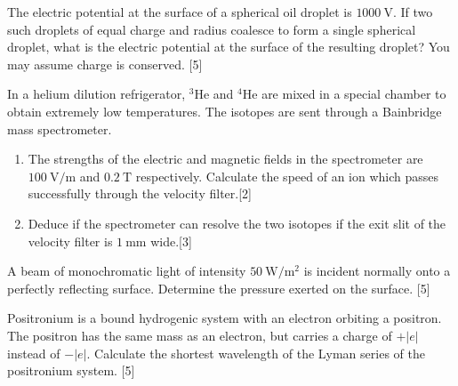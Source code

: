 \begin{problem}
    \begin{subproblem}
        The electric potential at the surface of a spherical oil droplet is $\qty{1000}{\V}$. If two such droplets of equal charge and radius coalesce to form a single spherical droplet, what is the electric potential at the surface of the resulting droplet? You may assume charge is conserved.
    \hfill{[5]}\end{subproblem}
    \begin{subproblem}
        In a helium dilution refrigerator, ${}^{3}\mathrm{He}$ and ${}^{4}\mathrm{He}$ are mixed in a special chamber to obtain extremely low temperatures. The isotopes are sent through a Bainbridge mass spectrometer.
        \renewcommand{\theenumi}{(\alph{enumi})}
        \begin{enumerate}
            \item The strengths of the electric and magnetic fields in the spectrometer are $\qty{100}{\V\per\m}$ and $\qty{0.2}{\tesla}$ respectively. Calculate the speed of an ion which passes successfully through the velocity filter.\hfill{[2]}
            \item Deduce if the spectrometer can resolve the two isotopes if the exit slit of the velocity filter is $\qty{1}{\mm}$ wide.\hfill{[3]}
        \end{enumerate}
    \end{subproblem}
\end{problem}

\begin{problem}
    \begin{subproblem}
        A beam of monochromatic light of intensity $\qty{50}{\W\per\square\m}$ is incident normally onto a perfectly reflecting surface. Determine the pressure exerted on the surface.
    \hfill{[5]}\end{subproblem}
    \begin{subproblem}
        Positronium is a bound hydrogenic system with an electron orbiting a positron. The positron has the same mass as an electron, but carries a charge of $+|e|$ instead of $-|e| .$ Calculate the shortest wavelength of the Lyman series of the positronium system.
    \hfill{[5]}\end{subproblem}
\end{problem}

